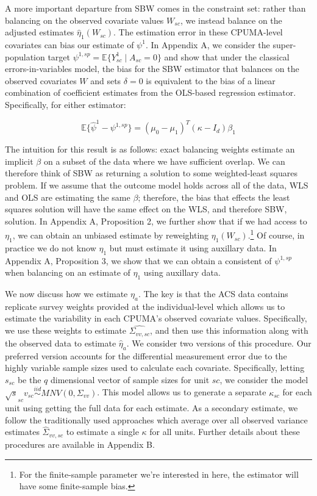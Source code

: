 \documentclass[aoas]{imsart}
\theoremstyle{plain}
\theoremstyle{remark}
\begin{document}
A more important departure from SBW comes in the constraint set: rather than balancing on the observed covariate values $W_{sc}$, we instead balance on the adjusted estimates $\hat{\eta}_1(W_{sc})$. The estimation error in these CPUMA-level covariates can bias our estimate of $\psi^1$. In Appendix A, we consider the super-population target $\psi^{1, sp} = \mathbb{E}\{Y_{sc}^1 \mid A_{sc} = 0\}$ and show that under the classical errors-in-variables model, the bias for the SBW estimator that balances on the observed covariates $W$ and sets $\delta = 0$ is equivalent to the bias of a linear combination of coefficient estimates from the OLS-based regression estimator. Specifically, for either estimator:

\begin{equation}
\mathbb{E}\{\hat{\psi}^{1} - \psi^{1, sp}\} = (\mu_0 - \mu_1)^T(\kappa - I_d)\beta_1
\end{equation}

The intuition for this result is as follows: exact balancing weights estimate an implicit $\beta$ on a subset of the data where we have sufficient overlap. We can therefore think of SBW as returning a solution to some weighted-least squares problem. If we assume that the outcome model holds across all of the data, WLS and OLS are estimating the same $\beta$; therefore, the bias that effects the least squares solution will have the same effect on the WLS, and therefore SBW, solution. In Appendix A, Proposition 2, we further show that if we had access to $\eta_1$, we can obtain an unbiased estimate by reweighting $\eta_1(W_{sc})$.\footnote{For the finite-sample parameter we're interested in here, the estimator will have some finite-sample bias.} Of course, in practice we do not know $\eta_1$ but must estimate it using auxillary data. In Appendix A, Proposition 3, we show that we can obtain a consistent of $\psi^{1, sp}$ when balancing on an estimate of $\eta_1$ using auxillary data. 

We now discuss how we estimate $\eta_a$. The key is that the ACS data contains replicate survey weights provided at the individual-level which allows us to estimate the variability in each CPUMA's observed covariate values. Specifically, we use these weights to estimate $\hat{\Sigma_{vv, sc}}$, and then use this information along with the observed data to estimate $\hat{\eta}_a$. We consider two versions of this procedure. Our preferred version accounts for the differential measurement error due to the highly variable sample sizes used to calculate each covariate. Specifically, letting $s_{sc}$ be the $q$ dimensional vector of sample sizes for unit $sc$, we consider the model $\sqrt{s}_{sc}v_{sc} \stackrel{iid}\sim MNV(0, \Sigma_{vv})$. This model allows us to generate a separate $\kappa_{sc}$ for each unit using getting the full data for each estimate. As a secondary estimate, we follow the traditionally used approaches which average over all observed variance estimates $\hat{\Sigma}_{vv, sc}$ to estimate a single $\kappa$ for all units. Further details about these procedures are available in Appendix B.
\end{document}
